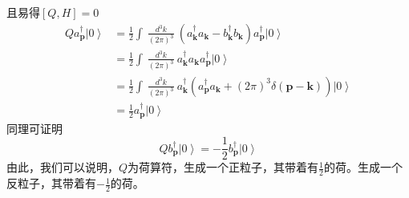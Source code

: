 \documentclass{article}
\begin{document}
且易得$[Q,H]=0$
\begin{align}
Q a^{\dagger}_{\mathbf{p}} \left | 0 \right \rangle &=\frac{1}{2} \int \: \frac{d^3 k }{(2 \pi)^3 } \:
	 (a^{\dagger}_{\mathbf{k}} a_{\mathbf{k}} - b^{\dagger}_{\mathbf{k}} b_{\mathbf{k}}  ) a^{\dagger}_{\mathbf{p}}
	 \left | 0 \right \rangle \nonumber \\
	 &=\frac{1}{2} \int \: \frac{d^3 k }{(2 \pi)^3 } \:
	 a^{\dagger}_{\mathbf{k}} a_{\mathbf{k}} a^{\dagger}_{\mathbf{p}}
	 \left | 0 \right \rangle \nonumber \\
	  &=\frac{1}{2} \int \: \frac{d^3 k }{(2 \pi)^3 } \:
	 a^{\dagger}_{\mathbf{k}}  (a^{\dagger}_{\mathbf{p}} a_{\mathbf{k}} +(2 \pi)^3 \delta(\mathbf{p}-\mathbf{k}))
	 \left | 0 \right \rangle \nonumber \\
 & =\frac{1}{2} a^{\dagger}_{\mathbf{p}} \left | 0 \right \rangle \nonumber 
\end{align}
同理可证明
$$Q b^{\dagger}_{\mathbf{p}} \left | 0 \right \rangle = -\frac{1}{2} b^{\dagger}_{\mathbf{p}} \left | 0 \right \rangle $$
由此，我们可以说明，$Q$为荷算符，生成一个正粒子，其带着有$\frac{1}{2}$的荷。生成一个反粒子，其带着有$-\frac{1}{2}$的荷。
\end{document}
